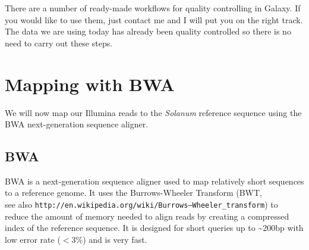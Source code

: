 \documentclass[12pt,a4paper]{article}
\begin{document}
There are a number of ready-made workflows for quality controlling in
Galaxy. If you would like to use them, just contact me and I will put
you on the right track.\\ 

The data we are using today has already been quality controlled so
there is no need to carry out these steps.

\section{Mapping with BWA}

We will now map our Illumina reads to the \emph{Solanum} reference
sequence using the BWA next-generation sequence aligner.

\subsection{BWA}

BWA is a next-generation sequence aligner used to map relatively short
sequences to a reference genome. It uses the Burrows-Wheeler Transform
(BWT, \\
see also \texttt{http://en.wikipedia.org/wiki/Burrows–Wheeler\_transform}) to
reduce the amount of memory needed to align reads by creating a
compressed index of the reference sequence. It is designed for short
queries up to \textasciitilde200bp with low error rate ($<$3\%) and is
very fast.
\end{document}

